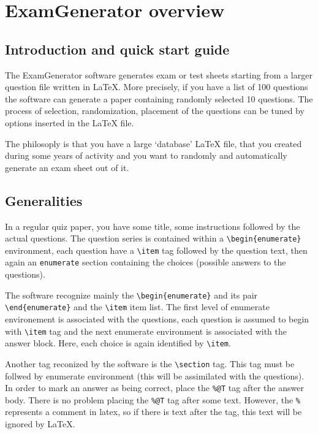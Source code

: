 \documentclass{article}
\begin{document}
\section{ExamGenerator overview}
\subsection{Introduction and quick start guide}

The ExamGenerator software generates exam or test sheets starting from a larger question file written in \LaTeX. More precisely, if you have a list of 100 questions the software can generate a paper containing randomly selected 10 questions. The process of selection, randomization, placement of the questions can be tuned by options inserted in the LaTeX file.

The philosoply is that you have a large `database' LaTeX file, that you created during some years of activity and you want to randomly and automatically generate an exam sheet out of it.
\subsection{Generalities}
In a regular quiz paper, you have some title, some instructions followed by the actual questions. The question series is contained within a \verb+\begin{enumerate}+ environment, each question have a \verb+\item+ tag followed by the question text, then again an \verb+enumerate+ section containing the choices (possible answers to the questions).

The software recognize mainly the \verb+\begin{enumerate}+  and its pair \verb+\end{enumerate}+ and the \verb+\item+ item list. The first level of enumerate environement is associated with the questions, each question is assumed to begin with \verb+\item+ tag and the next enumerate environment is associated with the answer block. Here, each choice is again identified by \verb+\item+. 

Another tag reconized by the software is the \verb+\section+ tag. This tag must be follwed by enumerate environment (this will be assimilated with the questions). In order to mark an answer as being correct, place the \verb+%@T+ tag after the answer body. There is no problem placing the \verb+%@T+ tag after some text. However, the \verb+%+ represents a comment in latex, so if there is text after the tag, this text will be ignored by LaTeX.\\
\end{document}
